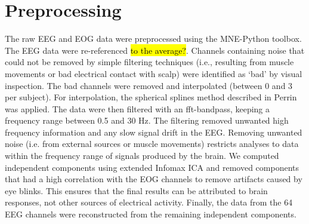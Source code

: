 \section{Preprocessing}
The raw EEG and EOG data were preprocessed using the MNE-Python toolbox. 
The EEG data were re-referenced \hl{to the average?}.
Channels containing noise that could not be removed by simple filtering techniques (i.e., resulting from muscle movements or bad electrical contact with scalp) were identified as `bad' by visual inspection.
The bad channels were removed and interpolated (between 0 and 3 per subject).
For interpolation, the spherical splines method described in Perrin \etal \citeyear{perrin_spherical_1989} was applied.
The data were then filtered with an fft-bandpass, keeping a frequency range between 0.5 and 30 Hz.
The filtering removed unwanted high frequency information and any slow signal drift in the EEG.
Removing unwanted noise (i.e. from external sources or muscle movements) restricts analyses to data within the frequency range of signals produced by the brain. 
We computed independent components using extended Infomax \ac{ICA} \cite{lee_independent_1999} and removed components that had a high correlation with the EOG channels to remove artifacts caused by eye blinks.
This ensures that the final results can be attributed to brain responses, not other sources of electrical activity.
Finally, the data from the 64 EEG channels were reconstructed from the remaining independent components.